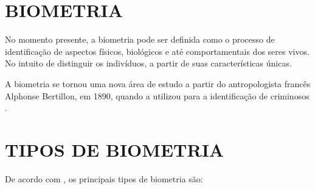 \section{BIOMETRIA}\label{sec:formatacaoTexto1}

No momento presente, a biometria pode ser definida como o processo de identificação 
de aspectos físicos, biológicos e até comportamentais dos seres vivos. No intuito 
de distinguir os indivíduos, a partir de suas características únicas. 

A biometria se tornou uma nova área de estudo a partir do antropologista francês
Alphonse Bertillon, em 1890, quando a utilizou para a identificação de criminosos
\cite{moraes2006}. 

\section{TIPOS DE BIOMETRIA}\label{sec:formatacaoTexto1}

De acordo com , os principais tipos de biometria são:

